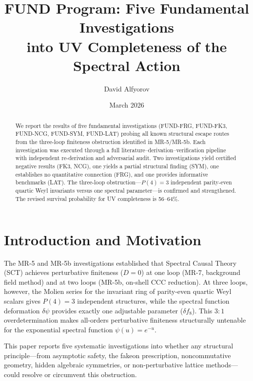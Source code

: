 \documentclass[12pt,a4paper]{article}
\title{\textbf{FUND Program: Five Fundamental Investigations\\[4pt]
into UV Completeness of the Spectral Action}}
\author{David Alfyorov}
\date{March 2026}
\begin{document}
\maketitle
\begin{center}
\end{center}

\begin{abstract}
We report the results of five fundamental investigations (FUND-FRG, FUND-FK3,
FUND-NCG, FUND-SYM, FUND-LAT) probing all known structural escape routes from
the three-loop finiteness obstruction identified in MR-5/MR-5b.  Each
investigation was executed through a full literature--derivation--verification
pipeline with independent re-derivation and adversarial audit.  Two
investigations yield certified negative results (FK3, NCG), one yields a partial
structural finding (SYM), one establishes no quantitative connection (FRG), and
one provides informative benchmarks (LAT).  The three-loop obstruction---$P(4)=3$
independent parity-even quartic Weyl invariants versus one spectral
parameter---is confirmed and strengthened.  The revised survival probability for
UV completeness is 56--64\%.
\end{abstract}

\tableofcontents
\newpage

\section{Introduction and Motivation}

The MR-5 and MR-5b investigations established that Spectral Causal Theory (SCT)
achieves perturbative finiteness ($D=0$) at one loop (MR-7, background field
method) and at two loops (MR-5b, on-shell CCC reduction).  At three loops,
however, the Molien series for the invariant ring of parity-even quartic Weyl
scalars gives $P(4) = 3$ independent structures, while the spectral function
deformation $\delta\psi$ provides exactly one adjustable parameter ($\delta f_8$).
This $3{:}1$ overdetermination makes all-orders perturbative finiteness
structurally untenable for the exponential spectral function $\psi(u) = e^{-u}$.

This paper reports five systematic investigations into whether any structural
principle---from asymptotic safety, the fakeon prescription, noncommutative
geometry, hidden algebraic symmetries, or non-perturbative lattice
methods---could resolve or circumvent this obstruction.
\end{document}
